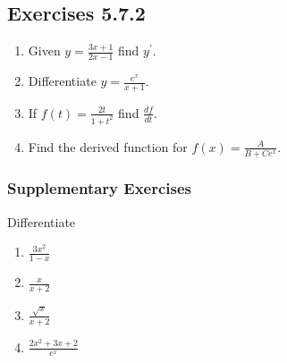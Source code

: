\subsection{Exercises 5.7.2}
\begin{enumerate}
\item Given $y =\frac{3 x +1}{2 x -1}$ find $y^{ \prime }$. 

\item Differentiate $y =\frac{e^{x}}{x +1}$. 

\item If $f (t) =\frac{2 t}{1 +t^{2}}$ find $\frac{d f}{d t}$. 

\item Find the derived function for $f (x) =\frac{A}{B +C e^{x}}$. \end{enumerate}


\subsubsection{Supplementary Exercises}
Differentiate 


\begin{enumerate}
\item $\frac{3 x^{2}}{1 -x}$ 

\item $\frac{x}{x +2}$ 

\item $\frac{\sqrt{x}}{x +2}$ 

\item $\frac{2 x^{2} +3 x +2}{e^{x}}$ \end{enumerate}


